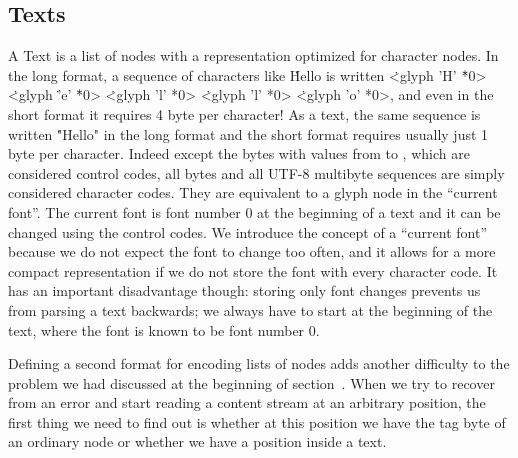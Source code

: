 \subsection{Texts}\label{text}
A Text is a list of nodes with a representation optimized for character nodes.
In the long format, a sequence of characters like \.{Hello} is written
\.{<glyph 'H'} \.{*0>} \.{<glyph} \.{'e'} \.{*0>} \.{<glyph 'l' *0>}
\.{<glyph 'l' *0>} \.{<glyph 'o' *0>}, and even in the short
format it requires 4 byte per character! As a text, the same sequence is written  \.{"Hello"} in the
long format and the short format requires usually just 1 byte per character.
Indeed except the bytes with values from  to , which are considered
control codes, all bytes and all \hbox{UTF-8} multibyte sequences
are simply considered character codes. They are equivalent to a glyph node
in the ``current font''. The current font
is font number 0 at the beginning of a text
and it can be changed using the control codes. We introduce the concept of a ``current font''
because we do not expect the font to change too often, and it allows for a more compact
representation if we do not store the font with every character code. It has an
important disadvantage though: storing only font changes prevents us from parsing
a text backwards; we always have to start at the beginning of the text, where the
font is known to be font number 0.

Defining a second format for encoding lists of nodes adds another difficulty to the problem we had
discussed at the beginning of section~. When we try to recover from an error and
start reading a content stream
at an arbitrary position, the first thing we need to find out is whether at this position we have
the tag byte of an ordinary node or whether we have a position inside a text.

